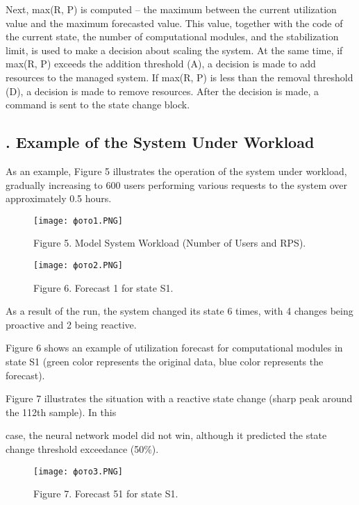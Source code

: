 \documentclass[a4paper,8pt]{article}
\begin{document}
\begin{multicols}{2}
Next, max(R, P) is computed – the maximum between the current utilization value and the maximum forecasted value. This value, together with the code of the current state, the number of computational modules, and the stabilization limit, is used to make a decision about scaling the system. At the same time, if max(R, P) exceeds the addition threshold (A), a decision is made to add resources to the managed system. If max(R, P) is less than the removal threshold (D), a decision is made to remove resources. After the decision is made, a command is sent to the state change block.

\subsection*{\centering \MakeUppercase{}. Example of the System Under Workload}

As an example, Figure 5 illustrates the operation of the system under workload, gradually increasing to 600 users performing various requests to the system over approximately 0.5 hours.

\begin{figure}[H]
    \centering
    \texttt{[image: фото1.PNG]}
    \caption*{Figure 5. Model System Workload (Number of Users and RPS).}
\end{figure}

\begin{figure}[H]
    \centering
    \texttt{[image: фото2.PNG]}
    \caption*{Figure 6. Forecast 1 for state S1.}
\end{figure}

As a result of the run, the system changed its state 6 times, with 4 changes being proactive and 2 being reactive.

Figure 6 shows an example of utilization forecast for computational modules in state S1 (green color represents the original data, blue color represents the forecast).

Figure 7 illustrates the situation with a reactive state change (sharp peak around the 112th sample). In this

case, the neural network model did not win, although it
predicted the state change threshold exceedance (50\%).

\begin{figure}[H]
    \centering
    \texttt{[image: фото3.PNG]}
    \caption*{Figure 7. Forecast 51 for state S1.}
\end{figure}


\end{multicols}
\end{document}
